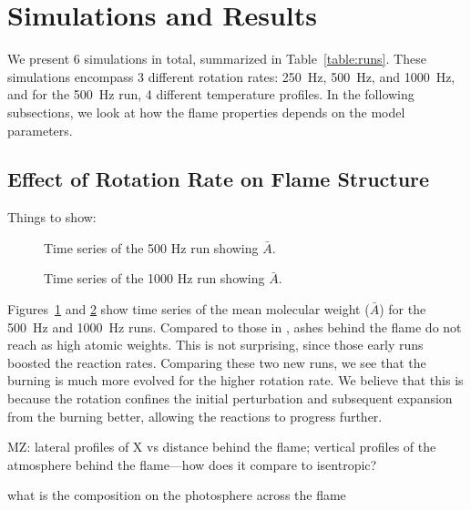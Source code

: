 \documentclass[preprint,times,tighten]{aastex63}
\begin{document}
\section{Simulations and Results}\label{Sec:results}


We present 6 simulations in total, summarized in
Table~\ref{table:runs}.  These simulations encompass 3 different
rotation rates: 250~Hz, 500~Hz, and 1000~Hz, and for the 500~Hz run, 4
different temperature profiles.  In the following subsections, we look
at how the flame properties depends on the model parameters.

\subsection{Effect of Rotation Rate on Flame Structure}\label{ssec:rot_structure}

Things to show:

\begin{figure}[t]
\centering
{}
\caption{\label{fig:time_series_500} Time series of the 500 Hz run showing $\bar{A}$.}
\end{figure}

\begin{figure}[t]
\centering
{}
\caption{\label{fig:time_series_1000} Time series of the 1000 Hz run showing $\bar{A}$.}
\end{figure}


Figures~\ref{fig:time_series_500} and \ref{fig:time_series_1000} show
time series of the mean molecular weight ($\bar{A}$) for the 500~Hz and 1000~Hz
runs.  Compared to those in \cite{flame_wave1}, ashes behind the flame
do not reach as high atomic weights.  This is not surprising, since
those early runs boosted the reaction rates.  Comparing these two new
runs, we see that the burning is much more evolved for the higher
rotation rate.  We believe that this is because the rotation confines
the initial perturbation and subsequent expansion from the burning
better, allowing the reactions to progress further.

MZ: lateral profiles of X vs distance behind the flame; 
vertical profiles of the atmosphere behind the flame---how does it compare to isentropic?

what is the composition on the photosphere across the flame
\end{document}
